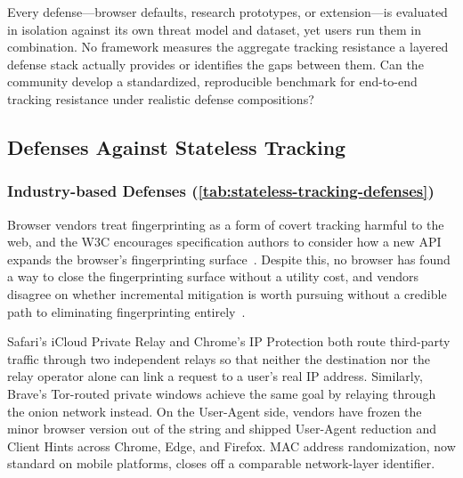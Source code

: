 \begin{opbox}
Every defense---browser defaults, research prototypes, or extension---is evaluated in isolation against its own threat model and dataset, yet users run them in combination. No framework measures the aggregate tracking resistance a layered defense stack actually provides or identifies the gaps between them. Can the community develop a standardized, reproducible benchmark for end-to-end tracking resistance under realistic defense compositions?
\end{opbox}


\subsection{Defenses Against Stateless Tracking}
\label{sec:stateless-defenses}





\subsubsection{Industry-based Defenses (\autoref{tab:stateless-tracking-defenses})}
\label{sec:stateless-defenses-industry}



Browser vendors treat fingerprinting as a form of covert tracking harmful to the web, and the W3C encourages specification authors to consider how a new API expands the browser's fingerprinting surface~\cite{nottinghamUnsanctionedWebTracking2015,dotyMitigatingBrowserFingerprinting2019}.
%
Despite this, no browser has found a way to close the fingerprinting surface without a utility cost, and vendors disagree on whether incremental mitigation is worth pursuing without a credible path to eliminating fingerprinting entirely~\cite{snyderBraveFingerprintingPrivacy2019,rescorlaTechnicalCommentsPrivacy2021}.


%
Safari's iCloud Private Relay and Chrome's IP Protection both route third-party traffic through two independent relays so that neither the destination nor the relay operator alone can link a request to a user's real IP address. 
%
Similarly, Brave's Tor-routed private windows achieve the same goal by relaying through the onion network instead.
%
On the User-Agent side, vendors have frozen the minor browser version out of the string and shipped User-Agent reduction and Client Hints across Chrome, Edge, and Firefox. 
%
MAC address randomization, now standard on mobile platforms, closes off a comparable network-layer identifier.


